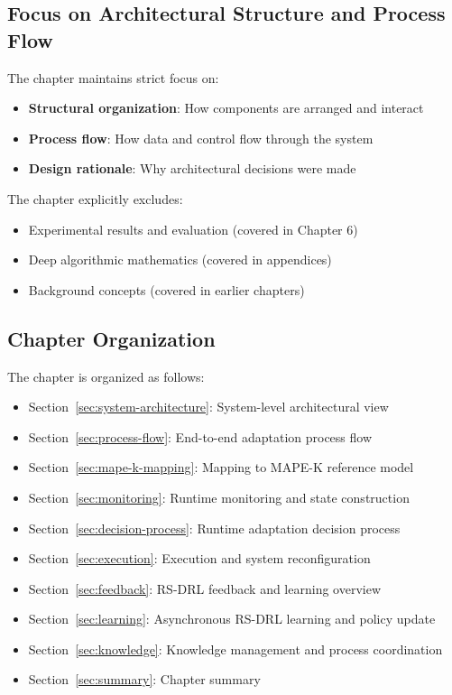 \documentclass[11pt,a4paper]{article}
\begin{document}
\subsection{Focus on Architectural Structure and Process Flow}

The chapter maintains strict focus on:
\begin{itemize}
    \item \textbf{Structural organization}: How components are arranged and interact
    \item \textbf{Process flow}: How data and control flow through the system
    \item \textbf{Design rationale}: Why architectural decisions were made
\end{itemize}

The chapter explicitly excludes:
\begin{itemize}
    \item Experimental results and evaluation (covered in Chapter 6)
    \item Deep algorithmic mathematics (covered in appendices)
    \item Background concepts (covered in earlier chapters)
\end{itemize}

\subsection{Chapter Organization}

The chapter is organized as follows:

\begin{itemize}
    \item Section~\ref{sec:system-architecture}: System-level architectural view
    \item Section~\ref{sec:process-flow}: End-to-end adaptation process flow
    \item Section~\ref{sec:mape-k-mapping}: Mapping to MAPE-K reference model
    \item Section~\ref{sec:monitoring}: Runtime monitoring and state construction
    \item Section~\ref{sec:decision-process}: Runtime adaptation decision process
    \item Section~\ref{sec:execution}: Execution and system reconfiguration
    \item Section~\ref{sec:feedback}: RS-DRL feedback and learning overview
    \item Section~\ref{sec:learning}: Asynchronous RS-DRL learning and policy update
    \item Section~\ref{sec:knowledge}: Knowledge management and process coordination
    \item Section~\ref{sec:summary}: Chapter summary
\end{itemize}
\end{document}
